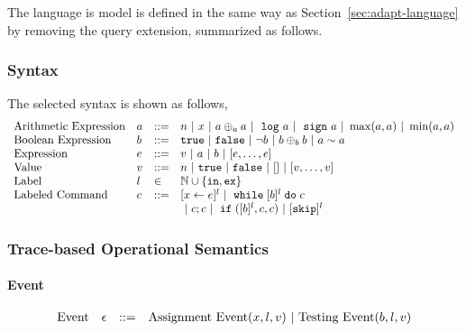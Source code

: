 The language is model is defined in the same way as Section~\ref{sec:adapt-language} by removing the query extension, summarized as follows.

\subsubsection{Syntax}
The selected syntax is shown as follows,
\[
\begin{array}{llll}
%
\mbox{Arithmetic Expression} 
& \aexpr & ::= & 
n ~|~ {x} ~|~ \aexpr \oplus_a \aexpr 
~|~ \elog \aexpr ~|~ \esign \aexpr ~|~ \max(a, a) ~|~ \min(a, a)
\\
%
\mbox{Boolean Expression} & \bexpr & ::= & 
%
\etrue ~|~ \efalse ~|~ \neg \bexpr
 ~|~ \bexpr \oplus_b \bexpr
%
~|~ \aexpr \sim \aexpr 
\\
%
\mbox{Expression} & \expr & ::= & v ~|~ \aexpr ~|~ \bexpr ~|~ [\expr, \dots, \expr]
\\ 
%
\mbox{Value} 
& v & ::= & { n ~|~ \etrue ~|~ \efalse ~|~ [] ~|~ [v, \dots, v]} 
\\
%
\mbox{Label} 
& l & \in & \mathbb{N} \cup \{\lin, \lex\} \\
\mbox{Labeled Command} 
& {c} & ::= & [\assign {{x}}{ {\expr}}]^{l}
~|~ {\ewhile [ \bexpr ]^{l} \edo {c} }
 \\
 &&&
~|~ {c};{c} 
~|~ \eif([\bexpr]{}^l , {c}, {c}) 
~|~ [\eskip]^l 
\end{array}
\]
\subsubsection{Trace-based Operational Semantics}
\paragraph{Event}
\[
\begin{array}{llll}
\mbox{Event} 
& \mathtt{\epsilon} & ::= & 
\mbox{Assignment Event}  ({x}, l, v) 
~|~ \mbox{Testing Event}(b, l, v) 
\end{array}
\]

